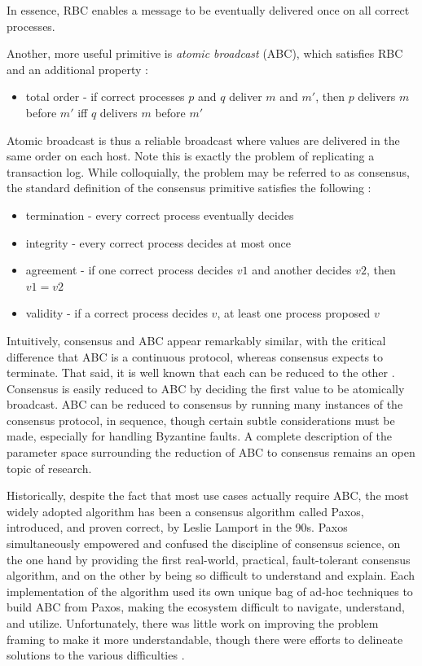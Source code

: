 In essence, RBC enables a message to be eventually delivered once on all correct processes.

Another, more useful primitive is \emph{atomic broadcast} (ABC), 
which satisfies RBC and an additional property \cite{chandra1996unreliable}:

\begin{itemize}
\item total order - if correct processes $p$ and $q$ deliver $m$ and $m'$, then $p$ delivers $m$ before $m'$ iff $q$ delivers $m$ before $m'$
\end{itemize}

Atomic broadcast is thus a reliable broadcast where values are delivered in the same order on each host. 
Note this is exactly the problem of replicating a transaction log.
While colloquially, the problem may be referred to as consensus, 
the standard definition of the consensus primitive satisfies the following \cite{chandra1996unreliable}:
\begin{itemize}
\item termination - every correct process eventually decides
\item integrity - every correct process decides at most once
\item agreement - if one correct process decides $v1$ and another decides $v2$, then $v1=v2$
\item validity - if a correct process decides $v$, at least one process proposed $v$
\end{itemize}

Intuitively, consensus and ABC appear remarkably similar, 
with the critical difference that ABC is a continuous protocol,
whereas consensus expects to terminate.
That said, it is well known that each can be reduced to the other \cite{chandra1996unreliable}.
Consensus is easily reduced to ABC by deciding the first value to be atomically broadcast.
ABC can be reduced to consensus by running many instances of the consensus protocol, 
in sequence, 
though certain subtle considerations must be made, 
especially for handling Byzantine faults.
A complete description of the parameter space surrounding
the reduction of ABC to consensus remains an open topic of research.

Historically, despite the fact that most use cases actually require ABC,
the most widely adopted algorithm has been a consensus algorithm called Paxos, 
introduced, and proven correct, by Leslie Lamport in the 90s.
Paxos simultaneously empowered and confused the discipline of consensus science,
on the one hand by providing the first real-world, practical, fault-tolerant consensus algorithm,
and on the other by being so difficult to understand and explain.
Each implementation of the algorithm used its own unique bag of ad-hoc techniques
to build ABC from Paxos, making the ecosystem difficult to navigate, understand, and utilize.
Unfortunately, there was little work on improving the problem framing to make it more understandable,
though there were efforts to delineate solutions to the various difficulties \cite{chandra2007paxos}.

